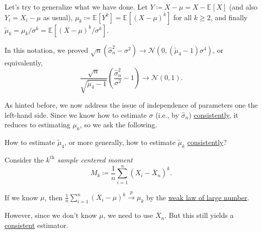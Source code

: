 Let's try to generalize what we have done. Let \(Y \coloneqq X - \mu = X - \mathbb{E}_{}[X] \) (and also \(Y_i = X_i - \mu \) as usual), \(\mu _k \coloneqq \mathbb{E}_{}[Y^k] = \mathbb{E}_{}[(X - \mu )^k] \) for all \(k \geq 2\), and finally \(\widetilde{\mu} _k = \mu _k / \sigma ^k = \mathbb{E}_{}\left[ (X-\mu )^k / \sigma ^k \right] \).

\begin{prev}
	In this notation, we proved \(\sqrt{n} (\hat{\sigma} _n^2 - \sigma ^2) \to \mathcal{N} (0, (\widetilde{\mu} _4 - 1)\sigma ^4) \), or equivalently,
	\[
		\frac{\sqrt{n} }{\sqrt{\widetilde{\mu} _4 - 1} } \left( \frac{\hat{\sigma} _n^2}{\sigma ^2} - 1 \right) \to \mathcal{N} (0, 1).
	\]
\end{prev}

As hinted before, we now address the issue of independence of parameters one the left-hand side. Since we know how to estimate \(\sigma \) (i.e., by \(\hat{\sigma} _n\)) \hyperref[def:consistent]{consistently}, it reduces to estimating \(\mu _k\), so we ask the following.

\begin{problem*}
	How to estimate \(\widetilde{\mu} _4\), or more generally, how to estimate \(\widetilde{\mu} _k\) \hyperref[def:consistent]{consistently}?
\end{problem*}

Consider the \emph{\(k^{\text{th} }\) sample centered moment}
\[
	M_k
	\coloneqq \frac{1}{n} \sum_{i=1}^{n} (X_i - \overline{X} _n)^k .
\]

\begin{intuition}
	If we know \(\mu \), then \(\frac{1}{n} \sum_{i=1}^{n} (X_i - \mu )^k \overset{p}{\to} \mu _k\) by the \hyperref[thm:WLLN]{weak law of large number}.
\end{intuition}

However, since we don't know \(\mu \), we need to use \(\overline{X} _n\). But this still yields a \hyperref[def:consistent]{consistent} estimator.


